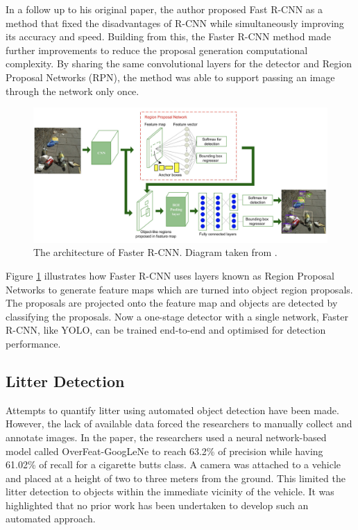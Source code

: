 \documentclass{thesis}
\begin{document}
In a follow up to his original paper, the author proposed Fast R-CNN as a method that fixed the disadvantages of R-CNN while simultaneously improving its accuracy and speed\cite{fast-rcnn}. Building from this, the Faster R-CNN method made further improvements to reduce the proposal generation computational complexity. By sharing the same convolutional layers for the detector and Region Proposal Networks (RPN), the method was able to support passing an image through the network only once\cite{frcnn}.

\begin{figure}[h]
    \centering
    \includegraphics[scale=0.5]{images/faster-rcnn-architecture.png}
    \caption{The architecture of Faster R-CNN. Diagram taken from \cite{smart-street}.}
    \label{fig:faster-rcnn-architecture}
\end{figure}

Figure \ref{fig:faster-rcnn-architecture} illustrates how Faster R-CNN uses layers known as Region Proposal Networks to generate feature maps which are turned into object region proposals. The proposals are projected onto the feature map and objects are detected by classifying the proposals. Now a one-stage detector with a single network, Faster R-CNN, like YOLO\cite{yolov1}, can be trained end-to-end and optimised for detection performance.

\subsection{Litter Detection}

Attempts to quantify litter using automated object detection have been made\cite{cvstreets}. However, the lack of available data forced the researchers to manually collect and annotate images. In the paper, the researchers used a neural network-based model called OverFeat-GoogLeNe to reach 63.2\% of precision while having 61.02\% of recall for a cigarette butts class. A camera was attached to a vehicle and placed at a height of two to three meters from the ground. This limited the litter detection to objects within the immediate vicinity of the vehicle. It was highlighted that no prior work has been undertaken to develop such an automated approach.
\end{document}
